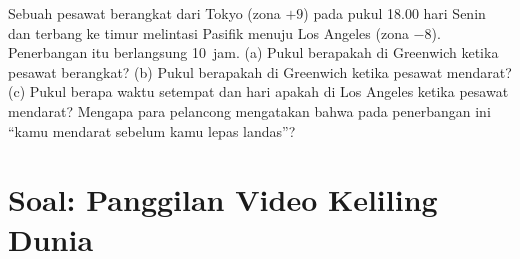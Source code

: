 \begin{exercise}[$\star\star\star$]\label{exo:g6:latitude-longitude:12}
Sebuah pesawat berangkat dari Tokyo (zona $+9$) pada pukul 18.00 hari Senin
dan terbang ke timur melintasi Pasifik menuju Los Angeles (zona $-8$).
Penerbangan itu berlangsung 10~jam. (a) Pukul berapakah di Greenwich ketika
pesawat berangkat? (b) Pukul berapakah di Greenwich ketika pesawat mendarat?
(c) Pukul berapa waktu setempat dan hari apakah di Los Angeles ketika
pesawat mendarat? Mengapa para pelancong mengatakan bahwa pada penerbangan
ini ``kamu mendarat sebelum kamu lepas landas''?
\end{exercise}

\section{Soal: Panggilan Video Keliling Dunia}


